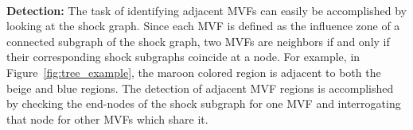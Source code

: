 
\noindent\\
{\bf Detection:} The task of identifying adjacent MVFs can easily be accomplished by looking at the shock graph. Since each MVF is defined as the influence zone of a connected subgraph of the shock graph, two MVFs are neighbors if and only if their corresponding shock subgraphs coincide at a node. For example, in Figure~\ref{fig:tree_example}, the maroon colored region is adjacent to both the beige and blue regions. The detection of adjacent MVF regions is accomplished by checking the end-nodes of the shock subgraph for one MVF and interrogating that node for other MVFs which share it.






